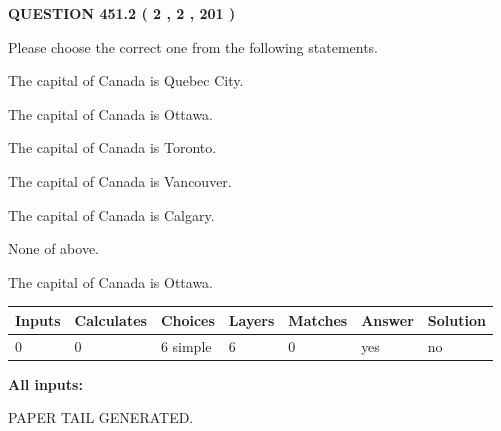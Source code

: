 \documentclass[12pt]{article}
\begin{document}
\vspace{0.2in}
  
{\textbf{\Large{QUESTION
451.2 
 ( 2 , 2 , 201 )
}}}
  
  
Please choose the correct one from the following statements.
 
 
The capital of Canada is Quebec City.
 
 
The capital of Canada is Ottawa.
 
 
The capital of Canada is Toronto.
 
 
The capital of Canada is Vancouver.
 
 
The capital of Canada is Calgary.
 
 
 None of above.
 
 
\noindent{}
 
 
The capital of Canada is Ottawa.
 
 
\noindent{}
 
 
   
   
   
   
\noindent\begin{tabular}{|l|l|l|l|l|l|l|}
 \hline
Inputs & Calculates & Choices & Layers & Matches & Answer & Solution \\ \hline
 0  & 
 0  & 
 6
  simple  
  & 
 6  & 
 0  & 
  yes & 
  no 
  \\ \hline
 \end{tabular}
   
   
   
   
\noindent{}
   
   
   
   
\noindent\vspace{0.1in}\hspace{-0.08in} {\textbf{\Large{All inputs: }}}
   
   
   
   
   
   
 \vspace{0.2in}
 
   
   
\vspace{2.0in} PAPER TAIL GENERATED.
   
\end{document}
